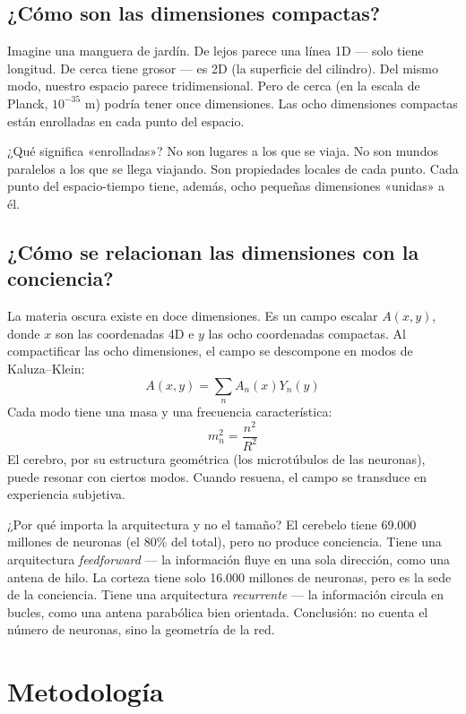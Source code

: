 \documentclass[11pt,a4paper]{article}
\begin{document}
\subsection{¿Cómo son las dimensiones compactas?}
Imagine una manguera de jardín. De lejos parece una línea 1D --- solo tiene longitud. De cerca tiene grosor --- es 2D (la superficie del cilindro). Del mismo modo, nuestro espacio parece tridimensional. Pero de cerca (en la escala de Planck, $10^{-35}$ m) podría tener once dimensiones. Las ocho dimensiones compactas están enrolladas en cada punto del espacio.

¿Qué significa «enrolladas»? No son lugares a los que se viaja. No son mundos paralelos a los que se llega viajando. Son propiedades locales de cada punto. Cada punto del espacio-tiempo tiene, además, ocho pequeñas dimensiones «unidas» a él.

\subsection{¿Cómo se relacionan las dimensiones con la conciencia?}
La materia oscura existe en doce dimensiones. Es un campo escalar $A(x,y)$, donde $x$ son las coordenadas 4D e $y$ las ocho coordenadas compactas. Al compactificar las ocho dimensiones, el campo se descompone en modos de Kaluza--Klein:
\begin{equation}
A(x,y) = \sum_n A_n(x) Y_n(y)
\end{equation}
Cada modo tiene una masa y una frecuencia característica:
\begin{equation}
m_n^2 = \frac{n^2}{R^2}
\end{equation}
El cerebro, por su estructura geométrica (los microtúbulos de las neuronas), puede resonar con ciertos modos. Cuando resuena, el campo se transduce en experiencia subjetiva.

¿Por qué importa la arquitectura y no el tamaño? El cerebelo tiene 69.000 millones de neuronas (el 80\% del total), pero no produce conciencia. Tiene una arquitectura \textit{feedforward} --- la información fluye en una sola dirección, como una antena de hilo. La corteza tiene solo 16.000 millones de neuronas, pero es la sede de la conciencia. Tiene una arquitectura \textit{recurrente} --- la información circula en bucles, como una antena parabólica bien orientada. Conclusión: no cuenta el número de neuronas, sino la geometría de la red.

\section{Metodología}
\end{document}
